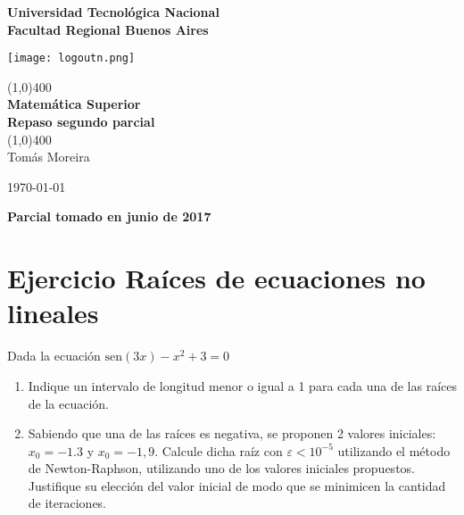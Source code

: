 \documentclass[11pt]{article}
\def\sen{\mathrm{sen}}
\begin{document}
		
	\begin{titlepage}
		\begin{center}
			\vspace*{0.5cm}
			\Large{\textbf{Universidad Tecnológica Nacional}}\\
			\Large{\textbf{Facultad Regional Buenos Aires}}\\
			\begin{center}
				\texttt{[image: logoutn.png]}
			\end{center}
			\vfill
			\line(1,0){400}\\
			\vspace*{0.3cm}
			\huge{\textbf{Matemática Superior}}\\
			\Large{\textbf{Repaso segundo parcial}}\\
			\line(1,0){400}\\
			\vfill
			Tomás Moreira \\
			
			
			\today
				
				
		\end{center}
	\end{titlepage}

	\tableofcontents
	\thispagestyle{empty}
	\clearpage

	\setcounter{page}{1}
	
	\textbf{\Large{Parcial tomado en junio de 2017}}
	\section{Ejercicio Raíces de ecuaciones no lineales}
	Dada la ecuación $\sen(3x)-x^2+3=0$
	
	\begin{enumerate}[label=\alph*)]
		\item Indique un intervalo de longitud menor o igual a 1 para cada una de las raíces de la ecuación.
		\item Sabiendo que una de las raíces es negativa, se proponen 2 valores iniciales: $x_0=-1.3$ y $x_0=-1,9$. Calcule dicha raíz con $\varepsilon<10^{-5}$ utilizando el método de Newton-Raphson, utilizando uno de los valores iniciales propuestos. Justifique su elección del valor inicial de modo que se minimicen la cantidad de iteraciones.
	\end{enumerate}
\end{document}
